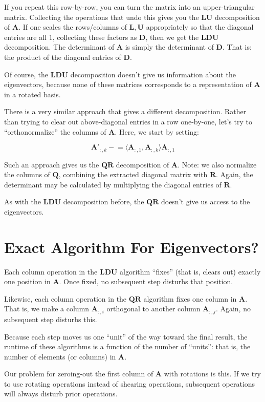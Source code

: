 \documentclass[11pt, oneside]{amsart}
\newcommand{\innerprod}[2]{\langle #1, #2 \rangle}
\newcommand{\mtx}[1]{\bm{#1}}
\newcommand{\minuseq}{\mathrel{-}=}
\newcommand{\mtxA}{\mtx{A}}
\newcommand{\mtxD}{\mtx{D}}
\newcommand{\mtxL}{\mtx{L}}
\newcommand{\mtxQ}{\mtx{Q}}
\newcommand{\mtxR}{\mtx{R}}
\newcommand{\mtxU}{\mtx{U}}
\newcommand{\mtxLU}{\mtxL\mtxU}
\newcommand{\mtxLDU}{\mtxL\mtxD\mtxU}
\newcommand{\mtxQR}{\mtxQ\mtxR}
\begin{document}
If you repeat this row-by-row, you can turn the matrix into an
upper-triangular matrix. Collecting the operations that undo this gives
you the $\mtxLU$ decomposition of $\mtxA$. If one scales the
rows/columns of $\mtxL, \mtxU$ appropriately so that the diagonal
entries are all $1$, collecting these factors as $\mtxD$, then we get
the $\mtxLDU$ decomposition. The determinant of $\mtxA$ is simply the
determinant of $\mtxD$. That is: the product of the diagonal entries of
$\mtxD$.

Of course, the $\mtxLDU$ decomposition doesn't give us information about
the eigenvectors, because none of these matrices corresponds to a
representation of $\mtxA$ in a rotated basis.

There is a very similar approach that gives a different decomposition.
Rather than trying to clear out above-diagonal entries in a row
one-by-one, let's try to ``orthonormalize'' the columns of $\mtxA$. Here,
we start by setting:

\[
  \mtxA'_{:, k} \minuseq \innerprod{\mtxA_{:, 1}}{\mtxA_{:,k}} \mtxA_{:, 1}
\]

Such an approach gives us the $\mtxQR$ decomposition of $\mtxA$.
Note: we also normalize the columns of $\mtxQ$, combining the extracted
diagonal matrix with $\mtxR$. Again, the determinant may be calculated
by multiplying the diagonal entries of $\mtxR$.

As with the $\mtxLDU$ decomposition before, the $\mtxQR$ doesn't give us
access to the eigenvectors.

\section{Exact Algorithm For Eigenvectors?}

Each column operation in the $\mtxLDU$ algorithm ``fixes'' (that is,
clears out) exactly one position in $\mtxA$. Once fixed, no subsequent
step disturbs that position.

Likewise, each column operation in the $\mtxQR$ algorithm fixes one
column in $\mtxA$. That is, we make a column $\mtxA_{:, i}$ orthogonal
to another column $\mtxA_{:, j}$. Again, no subsequent step disturbs
this.

Because each step moves us one ``unit'' of the way toward the final
result, the runtime of these algorithms is a function of the number of
``units'': that is, the number of elements (or columns) in $\mtxA$.

Our problem for zeroing-out the first column of $\mtxA$ with rotations
is this. If we try to use rotating operations instead of shearing
operations, subsequent operations will always disturb prior operations.
\end{document}

